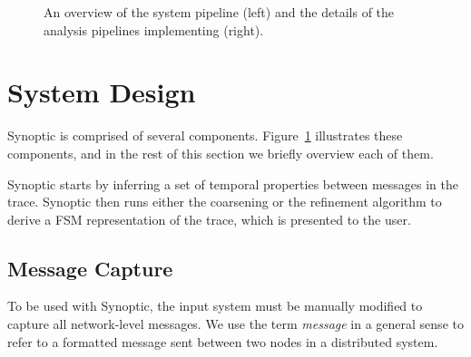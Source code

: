 \begin{figure}[!t]
  \caption{An overview of the system pipeline (left) and the details
    of the analysis pipelines implementing (right).}
  \label{fig:design}
\end{figure}

\section{System Design}
\label{sec:design}

Synoptic is comprised of several components. Figure~\ref{fig:design}
illustrates these components, and in the rest of this section we
briefly overview each of them.

Synoptic starts by inferring a set of temporal properties between
messages in the trace. Synoptic then runs either the coarsening or the
refinement algorithm to derive a FSM representation of the trace,
which is presented to the user. 

\subsection{Message Capture}

To be used with Synoptic, the input system must be manually modified
to capture all network-level messages. We use the term \emph{message}
in a general sense to refer to a formatted message sent between two
nodes in a distributed system.

